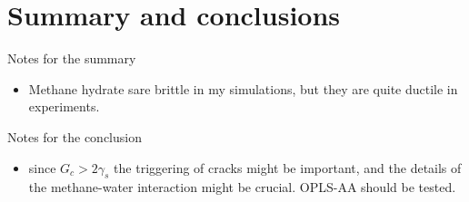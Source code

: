 \chapter{Summary and conclusions}

Notes for the summary
\begin{itemize}
\item Methane hydrate sare brittle in my simulations, but they are quite ductile in experiments.
\end{itemize}

Notes for the conclusion
\begin{itemize}
\item since $G_c > 2\gamma_s$ the triggering of cracks might be important, and the details of the methane-water interaction might be crucial. OPLS-AA should be tested.
\end{itemize}